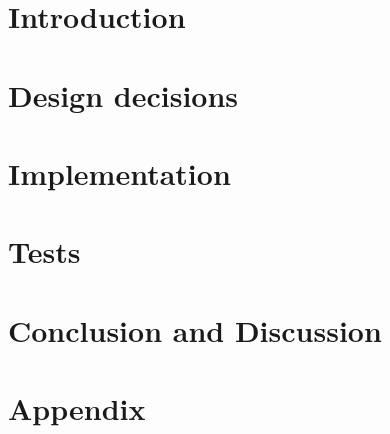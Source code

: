 
\section{Introduction}

\section{Design decisions}

\section{Implementation}

\section{Tests}

\section{Conclusion and Discussion}

\section{Appendix}
